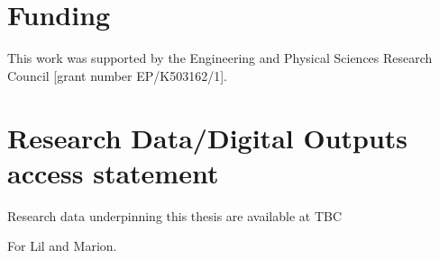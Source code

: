 \documentclass[10pt,a4paper,twoside]{book}
\begin{document}
\newpage
\section*{Funding}

This work was supported by the Engineering and Physical Sciences Research Council [grant number EP/K503162/1].

\section*{Research Data/Digital Outputs access statement}


Research data underpinning this thesis are available at TBC
\null\newpage
\null\newpage
\null\newpage
\begin{center}
    \vspace*{\fill}
    For Lil and Marion.
    \vspace*{\fill}
\end{center}
\clearpage
\null\newpage

\tableofcontents
\printnoidxglossaries
\newpage

\renewcommand{\cftdotsep}{\cftnodots}%

\listoffigures
{}

\mainmatter











\end{document}
